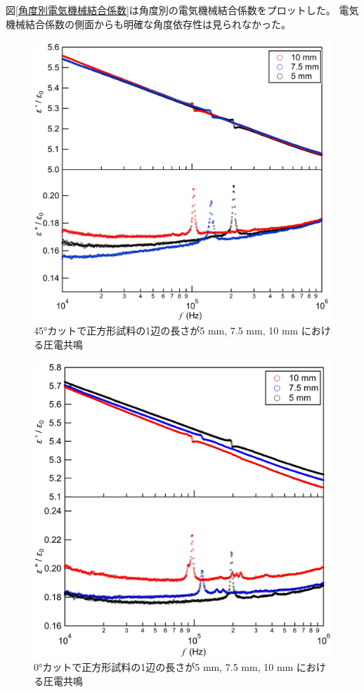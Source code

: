 \documentclass[dvipdfmx,12pt,a4paper]{jreport}
\begin{document}
		図\ref{角度別電気機械結合係数}は角度別の電気機械結合係数をプロットした。
		電気機械結合係数の側面からも明確な角度依存性は見られなかった。
		\begin{figure}[h]
			\centering
			\includegraphics[scale=1]{45deg_he_hi_ru.jpg}
			\caption{45°カットで正方形試料の1辺の長さが5 mm, 7.5 mm, 10 mm における圧電共鳴}
			\label{45deg_cut_piezo_resonant}
		\end{figure}
		\begin{figure}[H]
			\centering
			\includegraphics[scale=1]{0deg_without_sericin_2.jpg}
			\caption{0°カットで正方形試料の1辺の長さが5 mm, 7.5 mm, 10 mm における圧電共鳴}
			\label{0deg_cut_piezo_resonant}
		\end{figure}
\end{document}
